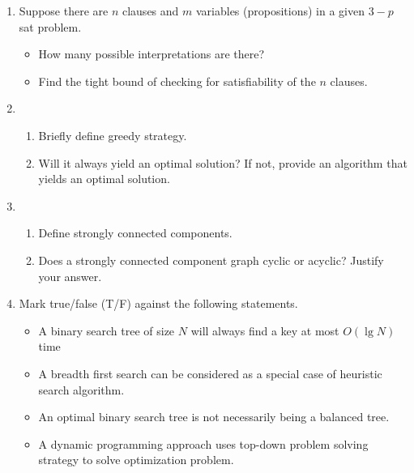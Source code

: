 \begin{enumerate}
	
	\item Suppose there are $n$ clauses and $m$ variables (propositions) in a given $3-p$ sat problem.
	\begin{itemize}
		\item How many possible interpretations are there?
		\item Find the tight bound of checking for satisfiability of the $n$ clauses.  
	\end{itemize}
	
	
	\item \begin{enumerate}
		\item Briefly define greedy strategy.
		\item Will it always yield an optimal solution?  If not, provide an algorithm that yields an optimal solution.  
	\end{enumerate}
	
	
	\item \begin{enumerate}
		\item Define strongly connected components.
		\item Does a strongly connected component graph cyclic or acyclic?  Justify your answer.  
	\end{enumerate}
	
	
	\item Mark true/false (T/F) against the following statements.  
	
	\begin{itemize}
		\item A binary search tree of size $N$ will always find a key at most $O(\lg N)$ time
		\item A breadth first search can be considered as a special case of heuristic search algorithm.
		\item An optimal binary search tree is not necessarily being a balanced tree.
		\item A dynamic programming approach uses top-down problem solving strategy to solve optimization problem.
	\end{itemize}
	

\end{enumerate}

